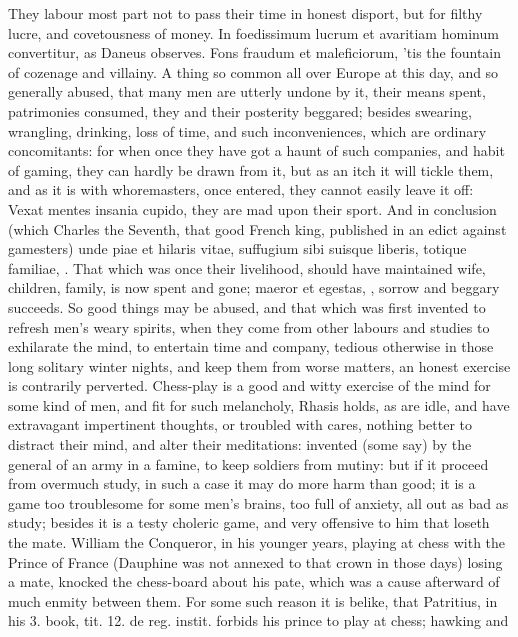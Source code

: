 {They labour most part not to pass their time in honest disport, but for
filthy lucre, and covetousness of money. In foedissimum lucrum et
avaritiam hominum convertitur, as Daneus observes. Fons fraudum et
maleficiorum, 'tis the fountain of cozenage and villainy. A thing
so common all over Europe at this day, and so generally abused, that
many men are utterly undone by it, their means spent, patrimonies
consumed, they and their posterity beggared; besides swearing,
wrangling, drinking, loss of time, and such inconveniences, which are
ordinary concomitants: for when once they have got a haunt of
such companies, and habit of gaming, they can hardly be drawn from it,
but as an itch it will tickle them, and as it is with whoremasters,
once entered, they cannot easily leave it off: Vexat mentes insania
cupido, they are mad upon their sport. And in conclusion (which Charles
the Seventh, that good French king, published in an edict against
gamesters) unde piae et hilaris vitae, suffugium sibi suisque liberis,
totique familiae, \etc{}. That which was once their livelihood, should have
maintained wife, children, family, is now spent and gone; maeror et
egestas, \etc{}, sorrow and beggary succeeds. So good things may be
abused, and that which was first invented to  refresh men's weary
spirits, when they come from other labours and studies to exhilarate
the mind, to entertain time and company, tedious otherwise in those
long solitary winter nights, and keep them from worse matters, an
honest exercise is contrarily perverted.
Chess-play is a good and witty exercise of the mind for some kind of
men, and fit for such melancholy, Rhasis holds, as are idle, and have
extravagant impertinent thoughts, or troubled with cares, nothing
better to distract their mind, and alter their meditations: invented
(some say) by the general of an army in a famine, to keep
soldiers from mutiny: but if it proceed from overmuch study, in such a
case it may do more harm than good; it is a game too troublesome for
some men's brains, too full of anxiety, all out as bad as study;
besides it is a testy choleric game, and very offensive to him that
loseth the mate. William the Conqueror, in his younger years,
playing at chess with the Prince of France (Dauphine was not annexed to
that crown in those days) losing a mate, knocked the chess-board about
his pate, which was a cause afterward of much enmity between them. For
some such reason it is belike, that Patritius, in his 3. book, tit. 12.
de reg. instit. forbids his prince to play at chess; hawking and
}
